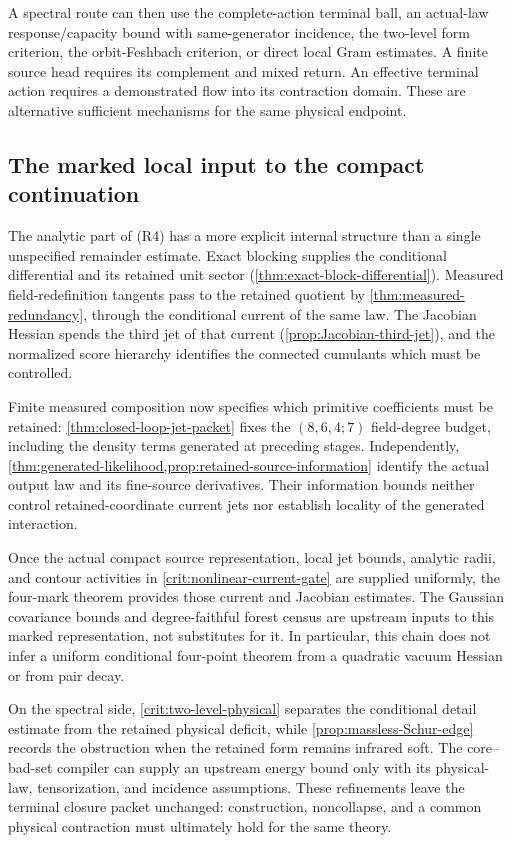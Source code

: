 \documentclass[11pt,oneside,openany]{book}
\theoremstyle{definition}
\theoremstyle{remark}
\begin{document}
A spectral route can then use the complete-action terminal ball, an
actual-law response/capacity bound with same-generator incidence, the
two-level form criterion, the orbit-Feshbach criterion, or direct local
Gram estimates. A finite source
head requires its complement and mixed return. An effective terminal
action requires a demonstrated flow into its contraction domain. These
are alternative sufficient mechanisms for the same physical endpoint.

\subsection{The marked local input to the compact continuation}
The analytic part of (R4) has a more explicit internal structure than a
single unspecified remainder estimate. Exact blocking supplies the
conditional differential and its retained unit sector
(\cref{thm:exact-block-differential}). Measured field-redefinition
tangents pass to the retained quotient by
\cref{thm:measured-redundancy}, through the conditional current of the
same law. The Jacobian Hessian spends the third jet of that current
(\cref{prop:Jacobian-third-jet}), and the normalized score hierarchy
identifies the connected cumulants which must be controlled.

Finite measured composition now specifies which primitive coefficients
must be retained: \cref{thm:closed-loop-jet-packet} fixes the
$(8,6,4;7)$ field-degree budget, including the density terms generated
at preceding stages. Independently,
\cref{thm:generated-likelihood,prop:retained-source-information}
identify the actual output law and its fine-source derivatives. Their
information bounds neither control retained-coordinate current jets
nor establish locality of the generated interaction.


Once the actual compact source representation, local jet bounds,
analytic radii, and contour activities in
\cref{crit:nonlinear-current-gate} are supplied uniformly, the
four-mark theorem provides those current and Jacobian estimates. The
Gaussian covariance bounds and degree-faithful forest census are
upstream inputs to this marked representation, not substitutes for
it. In particular, this chain does not infer a uniform conditional
four-point theorem from a quadratic vacuum Hessian or from pair decay.

On the spectral side, \cref{crit:two-level-physical} separates the
conditional detail estimate from the retained physical deficit, while
\cref{prop:massless-Schur-edge} records the obstruction when the retained
form remains infrared soft. The core--bad-set compiler can supply an
upstream energy bound only with its physical-law, tensorization, and
incidence assumptions. These refinements leave the terminal closure
packet unchanged: construction, noncollapse, and a common physical
contraction must ultimately hold for the same theory.
\end{document}
